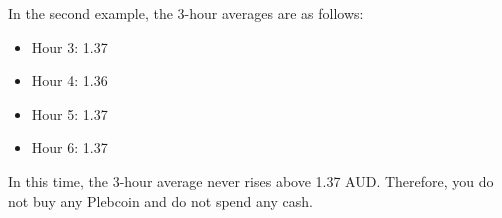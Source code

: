 In the second example, the 3-hour averages are as follows:
\begin{itemize}
    \item Hour 3: 1.37
    \item Hour 4: 1.36
    \item Hour 5: 1.37
    \item Hour 6: 1.37
\end{itemize}
In this time, the 3-hour average never rises above 1.37 AUD. Therefore, you do not buy any Plebcoin and do not spend any cash.